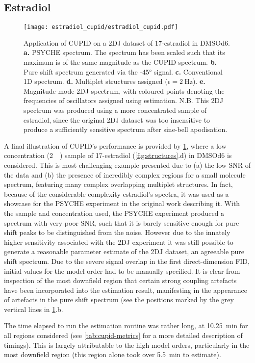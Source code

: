 \subsection{Estradiol}
\begin{figure}
    \texttt{[image: estradiol\_cupid/estradiol\_cupid.pdf]}%
    \caption[
        Application of \acs{CUPID} on a 17\textbeta-estradiol dataset.
    ]{
        Application of \acs{CUPID} on a \ac{2DJ} dataset of 17\textbeta-estradiol
        in \acs{DMSOd6}.
        \textbf{a.} \acs{PSYCHE} spectrum.
        The spectrum has been scaled such that its maximum is of the same
        magnitude as the \acs{CUPID} spectrum.
        \textbf{b.} Pure shift spectrum generated via the \ang{-45} signal.
        \textbf{c.} Conventional \ac{1D} spectrum.
        \textbf{d.} Multiplet structures assigned ($\epsilon =
        \qty{2}{\hertz}$).
        \textbf{e.} Magnitude-mode \ac{2DJ} spectrum, with coloured points
        denoting the frequencies of oscillators assigned using estimation.
        N.B. This \ac{2DJ} spectrum was produced using a more concentrated
        sample of estradiol, since the original \ac{2DJ} dataset was too
        insensitive to produce a sufficiently sensitive spectrum after
        sine-bell apodisation.
    }
    \label{fig:estradiol-cupid}%
\end{figure}

A final illustration of \ac{CUPID}'s performance is provided by
\cref{fig:estradiol-cupid},
where a low concentration (\qty{2}{\milli\molar}) sample of
17\textbeta-estradiol (\cref{fig:structures}.d) in \acs{DMSOd6} is
considered. This is most challenging example presented due
to (a) the low \ac{SNR} of the data and (b) the presence of incredibly complex
regions for a small molecule spectrum, featuring many complex overlapping
multiplet structures. In fact, because of the considerable complexity
estradiol's spectra, it was used as a showcase for
the \ac{PSYCHE} experiment in the original work describing
it\cite{Foroozandeh2014}. With the sample and concentration used, the
\ac{PSYCHE} experiment produced a spectrum with very poor
\ac{SNR}, such that it is barely sensitive enough for pure shift peaks to be
distinguished from the noise. However due to the innately higher
sensitivity associated with the \ac{2DJ} experiment it was still possible to
generate a reasonable parameter estimate of the \ac{2DJ} dataset, an agreeable
pure shift spectrum. Due to the severe signal overlap in the first
direct-dimension \ac{FID}, initial values for the model order had to be
manually specified. It is clear from inspection of the most downfield region
that certain strong coupling artefacts have been incorporated into the
estimation result, manifesting in the appearance of artefacts in the pure shift
spectrum (see the positions marked by the grey vertical lines in
\cref{fig:estradiol-cupid}.b.

The time elapsed to run the estimation routine was rather
long, at \qty{10.25}{\minute} for all regions considered (see
\cref{tab:cupid-metrics} for a more detailed description of timings). This is
largely attributable to the high model orders, particularly in the most
downfield region (this region alone took over \qty{5.5}{\minute} to estimate).
